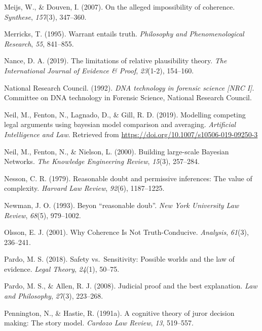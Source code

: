 \documentclass[11pt,dvipsnames,enabledeprecatedfontcommands]{scrartcl}
\begin{document}
\leavevmode\hypertarget{ref-meijs2007}{}%
Meijs, W., \& Douven, I. (2007). On the alleged impossibility of
coherence. \emph{Synthese}, \emph{157}(3), 347--360.

\leavevmode\hypertarget{ref-Merricks1995}{}%
Merricks, T. (1995). Warrant entails truth. \emph{Philosophy and
Phenomenological Research}, \emph{55}, 841--855.

\leavevmode\hypertarget{ref-nance2019LimitationsRelativePlausibility}{}%
Nance, D. A. (2019). The limitations of relative plausibility theory.
\emph{The International Journal of Evidence \& Proof}, \emph{23}(1-2),
154--160.

\leavevmode\hypertarget{ref-NRCI1992}{}%
National Research Council. (1992). \emph{DNA technology in forensic
science \textup{{[}NRC I{]}}}. Committee on DNA technology in Forensic
Science, National Research Council.

\leavevmode\hypertarget{ref-Fenton2019Modelling}{}%
Neil, M., Fenton, N., Lagnado, D., \& Gill, R. D. (2019). Modelling
competing legal arguments using bayesian model comparison and averaging.
\emph{Artificial Intelligence and Law}. Retrieved from
\url{https://doi.org/10.1007/s10506-019-09250-3}

\leavevmode\hypertarget{ref-neil2000BuildingLargescaleBayesian}{}%
Neil, M., Fenton, N., \& Nielson, L. (2000). Building large-scale
Bayesian Networks. \emph{The Knowledge Engineering Review},
\emph{15}(3), 257--284.

\leavevmode\hypertarget{ref-Nesson1979Reasonable-doub}{}%
Nesson, C. R. (1979). Reasonable doubt and permissive inferences: The
value of complexity. \emph{Harvard Law Review}, \emph{92}(6),
1187--1225.

\leavevmode\hypertarget{ref-newman1993}{}%
Newman, J. O. (1993). Beyon ``reasonable doub''. \emph{New York
University Law Review}, \emph{68}(5), 979--1002.

\leavevmode\hypertarget{ref-olsson2001}{}%
Olsson, E. J. (2001). Why Coherence Is Not Truth-Conducive.
\emph{Analysis}, \emph{61}(3), 236--241.

\leavevmode\hypertarget{ref-pardo2018}{}%
Pardo, M. S. (2018). Safety vs.~Sensitivity: Possible worlds and the law
of evidence. \emph{Legal Theory}, \emph{24}(1), 50--75.

\leavevmode\hypertarget{ref-Pardo2008judicial}{}%
Pardo, M. S., \& Allen, R. J. (2008). Judicial proof and the best
explanation. \emph{Law and Philosophy}, \emph{27}(3), 223--268.

\leavevmode\hypertarget{ref-Pennington1991}{}%
Pennington, N., \& Hastie, R. (1991a). A cognitive theory of juror
decision making: The story model. \emph{Cardozo Law Review}, \emph{13},
519--557.
\end{document}
